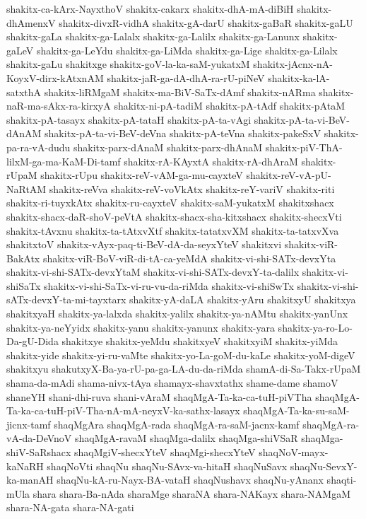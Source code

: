 {shakitx-ca-kArx-NayxthoV
shakitx-cakarx
shakitx-dhA-mA-diBiH
shakitx-dhAmenxV
shakitx-divxR-vidhA
shakitx-gA-darU
shakitx-gaBaR
shakitx-gaLU
shakitx-gaLa
shakitx-ga-Lalalx
shakitx-ga-Lalilx
shakitx-ga-Lanunx
shakitx-gaLeV
shakitx-ga-LeYdu
shakitx-ga-LiMda
shakitx-ga-Lige
shakitx-ga-Lilalx
shakitx-gaLu
shakitxge
shakitx-goV-la-ka-saM-yukatxM
shakitx-jAcnx-nA-KoyxV-dirx-kAtxnAM
shakitx-jaR-ga-dA-dhA-ra-rU-piNeV
shakitx-ka-lA-satxthA
shakitx-liRMgaM
shakitx-ma-BiV-SaTx-dAmf
shakitx-nARma
shakitx-naR-ma-sAkx-ra-kirxyA
shakitx-ni-pA-tadiM
shakitx-pA-tAdf
shakitx-pAtaM
shakitx-pA-tasayx
shakitx-pA-tataH
shakitx-pA-ta-vAgi
shakitx-pA-ta-vi-BeV-dAnAM
shakitx-pA-ta-vi-BeV-deVna
shakitx-pA-teVna
shakitx-pakeSxV
shakitx-pa-ra-vA-dudu
shakitx-parx-dAnaM
shakitx-parx-dhAnaM
shakitx-piV-ThA-lilxM-ga-ma-KaM-Di-tamf
shakitx-rA-KAyxtA
shakitx-rA-dhAraM
shakitx-rUpaM
shakitx-rUpu
shakitx-reV-vAM-ga-mu-cayxteV
shakitx-reV-vA-pU-NaRtAM
shakitx-reVva
shakitx-reV-voVkAtx
shakitx-reY-variV
shakitx-riti
shakitx-ri-tuyxkAtx
shakitx-ru-cayxteV
shakitx-saM-yukatxM
shakitxshacx
shakitx-shacx-daR-shoV-peVtA
shakitx-shacx-sha-kitxshacx
shakitx-shecxVti
shakitx-tAvxnu
shakitx-ta-tAtxvXtf
shakitx-tatatxvXM
shakitx-ta-tatxvXva
shakitxtoV
shakitx-vAyx-paq-ti-BeV-dA-da-seyxYteV
shakitxvi
shakitx-viR-BakAtx
shakitx-viR-BoV-viR-di-tA-ca-yeMdA
shakitx-vi-shi-SATx-devxYta
shakitx-vi-shi-SATx-devxYtaM
shakitx-vi-shi-SATx-devxY-ta-dalilx
shakitx-vi-shiSaTx
shakitx-vi-shi-SaTx-vi-ru-vu-da-riMda
shakitx-vi-shiSwTx
shakitx-vi-shi-sATx-devxY-ta-mi-tayxtarx
shakitx-yA-daLA
shakitx-yAru
shakitxyU
shakitxya
shakitxyaH
shakitx-ya-lalxda
shakitx-yalilx
shakitx-ya-nAMtu
shakitx-yanUnx
shakitx-ya-neYyidx
shakitx-yanu
shakitx-yanunx
shakitx-yara
shakitx-ya-ro-Lo-Da-gU-Dida
shakitxye
shakitx-yeMdu
shakitxyeV
shakitxyiM
shakitx-yiMda
shakitx-yide
shakitx-yi-ru-vaMte
shakitx-yo-La-goM-du-kaLe
shakitx-yoM-digeV
shakitxyu
shakutxyX-Ba-ya-rU-pa-ga-LA-du-da-riMda
shamA-di-Sa-Takx-rUpaM
shama-da-mAdi
shama-nivx-tAya
shamayx-shavxtathx
shame-dame
shamoV
shaneYH
shani-dhi-ruva
shani-vAraM
shaqMgA-Ta-ka-ca-tuH-piVTha
shaqMgA-Ta-ka-ca-tuH-piV-Tha-nA-mA-neyxV-ka-sathx-lasayx
shaqMgA-Ta-ka-su-saM-jicnx-tamf
shaqMgAra
shaqMgA-rada
shaqMgA-ra-saM-jacnx-kamf
shaqMgA-ra-vA-da-DeVnoV
shaqMgA-ravaM
shaqMga-dalilx
shaqMga-shiVSaR
shaqMga-shiV-SaRshacx
shaqMgiV-shecxYteV
shaqMgi-shecxYteV
shaqNoV-mayx-kaNaRH
shaqNoVti
shaqNu
shaqNu-SAvx-va-hitaH
shaqNuSavx
shaqNu-SevxY-ka-manAH
shaqNu-kA-ru-Nayx-BA-vataH
shaqNushavx
shaqNu-yAnanx
shaqti-mUla
shara
shara-Ba-nAda
sharaMge
sharaNA
shara-NAKayx
shara-NAMgaM
shara-NA-gata
shara-NA-gati
}
